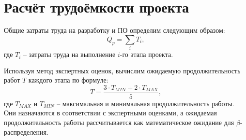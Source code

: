 \section{Расчёт трудоёмкости проекта} \label{economics_laboriousness}

Общие затраты труда на разработку и ПО определим следующим образом:
\begin{equation}
  \label{eq:common_laboriousness}
Q_p = \sum_{i} T_i,
\end{equation}
где $T_i$ -- затраты труда на выполнение $i$-го этапа проекта.

Используя метод экспертных оценок, вычислим ожидаемую продолжительность работ $T$ каждого этапа по формуле:
\begin{equation}
  \label{eq:work_duration}
T = \frac {3 \cdot T_{MIN} + 2 \cdot T_{MAX}} {5},
\end{equation}
где $T_{MAX}$ и $T_{MIN}$ – максимальная и минимальная продолжительность работы. Они назначаются в соответствии с экспертными оценками, а ожидаемая продолжительность работы рассчитывается как математическое ожидание для $\beta$- распределения.

